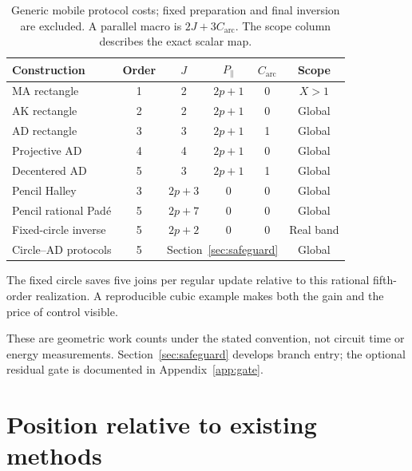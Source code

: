 \documentclass[11pt,a4paper]{article}
\begin{document}
\begin{table}[H]\centering\small
\caption{Generic mobile protocol costs; fixed preparation and final inversion are excluded. A parallel macro is $2J+3C_{\mathrm{arc}}$. The scope column describes the exact scalar map.}
\begin{tabularx}{\linewidth}{@{}Xccccc@{}}\toprule
Construction & Order & $J$ & $P_{\parallel}$ & $C_{\mathrm{arc}}$ & Scope\\\midrule
MA rectangle & 1 & 2 & $2p+1$ & 0 & $X>1$\\
AK rectangle & 2 & 2 & $2p+1$ & 0 & Global\\
AD rectangle & 3 & 3 & $2p+1$ & 1 & Global\\
Projective AD & 4 & 4 & $2p+1$ & 0 & Global\\
Decentered AD & 5 & 3 & $2p+1$ & 1 & Global\\
Pencil Halley & 3 & $2p+3$ & 0 & 0 & Global\\
Pencil rational Pad\'e & 5 & $2p+7$ & 0 & 0 & Global\\
Fixed-circle inverse & 5 & $2p+2$ & 0 & 0 & Real band\\
Circle--AD protocols & 5 & \multicolumn{3}{c}{Section~\ref{sec:safeguard}} & Global\\\bottomrule
\end{tabularx}
\end{table}
The fixed circle saves five joins per regular update relative to this rational fifth-order realization. A reproducible cubic example makes both the gain and the price of control visible.
\begin{table}[H]\centering\small
\caption{Steps / mobile joins to obtain $|s/a-1|\le10^{-d}$ from $p=3,X=2,s_0=3/4$, computed at 250 digits. The first three rows sum per-step costs, including power evaluation, with no separate initialization charge. The last two rows additionally include 12 joins to initialize their binary residual cache. Fixed preparation and final inversion are excluded throughout; all circle trials here are regular and accepted.}\label{tab:accuracy}
\end{table}
These are geometric work counts under the stated convention, not circuit time or energy measurements. Section~\ref{sec:safeguard} develops branch entry; the optional residual gate is documented in Appendix~\ref{app:gate}.


\clearpage
\section{Position relative to existing methods}\label{sec:prior}
\end{document}
